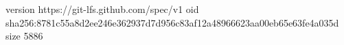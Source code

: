 version https://git-lfs.github.com/spec/v1
oid sha256:8781c55a8d2ee246e362937d7d956c83af12a48966623aa00eb65e63fe4a035d
size 5886
